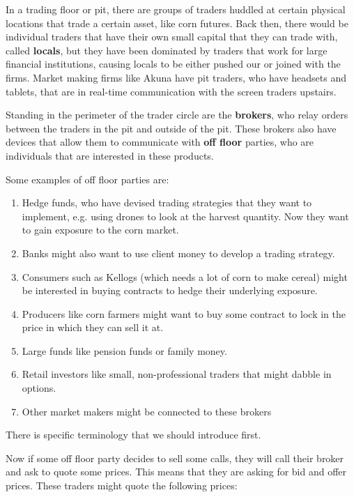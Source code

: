 \documentclass{article}
\begin{document}
    In a trading floor or pit, there are groups of traders huddled at certain physical locations that trade a certain asset, like corn futures. Back then, there would be individual traders that have their own small capital that they can trade with, called \textbf{locals}, but they have been dominated by traders that work for large financial institutions, causing locals to be either pushed our or joined with the firms. Market making firms like Akuna have pit traders, who have headsets and tablets, that are in real-time communication with the screen traders upstairs. 

    Standing in the perimeter of the trader circle are the \textbf{brokers}, who relay orders between the traders in the pit and outside of the pit. These brokers also have devices that allow them to communicate with \textbf{off floor} parties, who are individuals that are interested in these products. 

    \begin{example}
      Some examples of off floor parties are: 
      \begin{enumerate}
        \item Hedge funds, who have devised trading strategies that they want to implement, e.g. using drones to look at the harvest quantity. Now they want to gain exposure to the corn market. 
        \item Banks might also want to use client money to develop a trading strategy. 
        \item Consumers such as Kellogs (which needs a lot of corn to make cereal) might be interested in buying contracts to hedge their underlying exposure. 
        \item Producers like corn farmers might want to buy some contract to lock in the price in which they can sell it at. 
        \item Large funds like pension funds or family money. 
        \item Retail investors like small, non-professional traders that might dabble in options.  
        \item Other market makers might be connected to these brokers
      \end{enumerate}
    \end{example}

    There is specific terminology that we should introduce first. 

    \begin{definition}
      
    \end{definition}
    Now if some off floor party decides to sell some calls, they will call their broker and ask to quote some prices. This means that they are asking for bid and offer prices. These traders might quote the following prices: 
\end{document}
